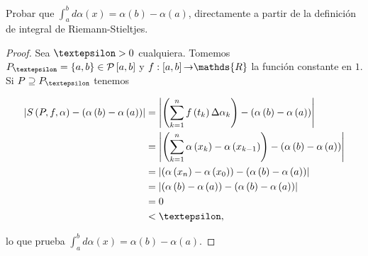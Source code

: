 \setcounter{section}{7}

\begin{exercise}
  Probar que $\int_{a}^{b}d\alpha\left(x\right)=\alpha\left(b\right)-\alpha\left(a\right)$, directamente a partir de la definición de integral de Riemann-Stieltjes.
\end{exercise}

\begin{proof}

Sea $\text{\textepsilon}>0$ cualquiera. Tomemos $P_{\text{\textepsilon}}=\left\lbrace a,b\right\rbrace\in\mathcal{P}\left[a,b\right]$ y $f:\left[a,b\right]\text{\textrightarrow}\mathds{R}$ la función constante en $1$. Si $P\supseteq P_{\text{\textepsilon}}$ tenemos

\begin{align*}
  \left| S\left(P,f,\alpha\right)-\left(\alpha\left(b\right)-\alpha\left(a\right)\right)\right|&=\left|\left(\sum_{k=1}^{n}f\left(t_k\right)\Delta\alpha_k\right)-\left(\alpha\left(b\right)-\alpha\left(a\right)\right) \right|\\
  &=\left|\left(\sum_{k=1}^{n} \alpha\left(x_k\right)-\alpha\left(x_{k-1}\right)\right)-\left(\alpha\left(b\right)-\alpha\left(a\right)\right)\right|\\
  &=\left|\left(\alpha\left(x_n\right)-\alpha\left(x_0\right)\right)-\left(\alpha\left(b\right)-\alpha\left(a\right)\right)\right|\\
  &=\left|\left(\alpha\left(b\right)-\alpha\left(a\right)\right)-\left(\alpha\left(b\right)-\alpha\left(a\right)\right)\right|\\
  &=0\\
  &<\text{\textepsilon},
\end{align*}

lo que prueba $\int_{a}^{b}d\alpha\left(x\right)=\alpha\left(b\right)-\alpha\left(a\right)$.
  
\end{proof}

